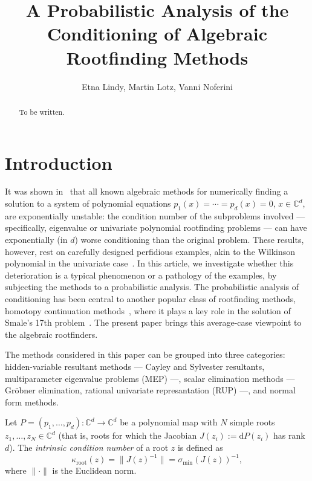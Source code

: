 \documentclass[12pt]{article}
\title{A Probabilistic Analysis of the Conditioning of Algebraic Rootfinding Methods}
\author{Etna Lindy, Martin Lotz, Vanni Noferini}
\def\C{\mathbb{C}}
\begin{document}
\maketitle

\begin{abstract}
  To be written.
\end{abstract}

\section{Introduction}
It was shown in~\cite{noferini2016numerical,graf2026numerical} that all known algebraic methods for numerically
finding a solution to a system of polynomial equations $p_1(x) = \cdots = p_d(x) = 0$, $x\in \C^d$, are
exponentially unstable: the condition number of the subproblems involved --- specifically, eigenvalue or univariate polynomial rootfinding problems --- can have exponentially (in $d$) worse conditioning than the original problem.
These results, however, rest on carefully designed perfidious examples, akin to the Wilkinson polynomial in the univariate case~\cite{wilkinson1984perfidious}. In this article, we investigate whether this deterioration is a typical phenomenon or a pathology of the examples, by subjecting the methods to a probabilistic analysis. The probabilistic analysis of conditioning has been central to another popular class of rootfinding methods, homotopy continuation methods~\cite{shub1993complexity,blum1998complexity,burgisser2013condition},
where it plays a key role in the solution of Smale's 17th problem~\cite{beltran2009smale,burgisser2011smale,lairez2017deterministic}. 
The present paper brings this average-case viewpoint to the algebraic rootfinders.

The methods considered in this paper can be grouped into three categories: hidden-variable resultant methods --- Cayley and Sylvester resultants, multiparameter eigenvalue problems (MEP) ---, scalar elimination methods --- Gr\"obner elimination, rational univariate represantation (RUP) ---, and normal form methods. 

Let $P=(p_1,\dots,p_d)\colon \C^d\to \C^d$ be a polynomial map with $N$ simple roots $z_1,\dots,z_N\in \C^d$ (that is, roots for which the Jacobian $J(z_i):=\mathrm{d}P(z_i)$ has rank $d$). The {\em intrinsic condition number} of a root $z$ is defined as 
\begin{equation*}
  \kappa_{\mathrm{root}}(z) = \|J(z)^{-1}\| = \sigma_{\min}(J(z))^{-1},
\end{equation*}
where $\|\cdot\|$ is the Euclidean norm.
\end{document}
